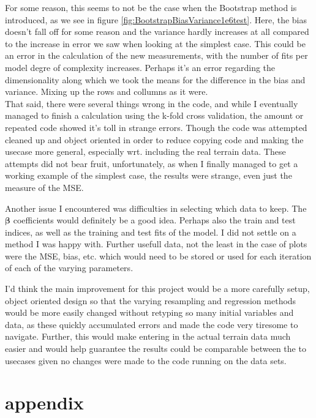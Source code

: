 \documentclass[15pt comic sans]{revtex4-2}
\begin{document}
For some reason, this seems to not be the case when the Bootstrap method is introduced, 
as we see in figure \ref{fig:BootstrapBiasVariance1e6test}.  Here, the bias doesn't fall off 
for some reason and the variance hardly increases at all compared to the increase in 
error we saw when looking at the simplest case. This could be an error in the calculation
of the new measurements, with the number of fits per model degre of complexity increases. 
Perhaps it's an error regarding the dimensionality along which we took the means for the
difference in the bias and variance. Mixing up the rows and collumns as it were. \\

That said, there were several things wrong in the code, and while I eventually managed to 
finish a calculation using the k-fold cross validation, the amount or repeated code showed
it's toll in strange errors. Though the code was attempted cleaned up and object oriented 
in order to reduce copying code and making the usecase more general, especially wrt.
including the real terrain data. These attempts did not bear fruit, unfortunately, as when
I finally managed to get a working example of the simplest case, the results were strange, 
even just the measure of the MSE. 

Another issue I encountered was difficulties in selecting which data to keep. The 
$\bm{\beta}$ coefficients would definitely be a good idea. Perhaps also the train and
test indices, as well as the training and test fits of the model. I did not settle on a 
method I was happy with. Further usefull data, not the least in the case of plots were the
MSE, bias, etc. which would need to be stored or used for each iteration of each of the 
varying parameters. 

I'd think the main improvement for this project would be a more carefully setup, object
oriented design so that the varying resampling and regression methods would be more 
easily changed without retyping so many initial variables and data, as these quickly 
accumulated errors and made the code very tiresome to navigate. Further, this would 
make entering in the actual terrain data much easier and would help guarantee the results
could be comparable between the to usecases given no changes were made to the code running
on the data sets.

\section{appendix}
\end{document}
